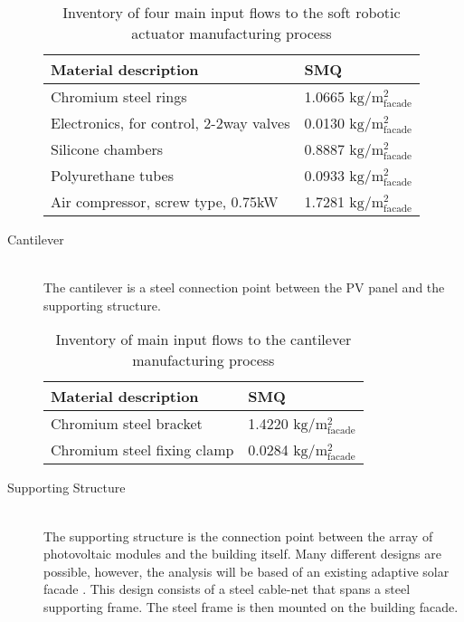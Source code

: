 \begin{description}
\begin{table}[H]
\centering
\begin{tabular}{ll}
\hline
Material description & SMQ \\ \hline
Chromium steel rings	 & 1.0665 ${\mathrm{kg/m^2_{facade}}}$ \\
Electronics, for control, 2-2way valves  & 0.0130  ${\mathrm{kg/m^2_{facade}}}$\\
Silicone chambers & 0.8887 ${\mathrm{kg/m^2_{facade}}}$\\
Polyurethane tubes &0.0933 ${\mathrm{kg/m^2_{facade}}}$\\
Air compressor, screw type, 0.75kW & 1.7281 ${\mathrm{kg/m^2_{facade}}}$\\
\hline
\end{tabular}
\caption{Inventory of four main input flows to the soft robotic actuator manufacturing process }
\label{tab:ActuatorInv}
\end{table}

\item[Cantilever] \hfill \\
The cantilever is a steel connection point between the PV panel and the supporting structure.\\

\begin{table}[H]
\centering
\begin{tabular}{ll}
\hline
Material description & SMQ \\ \hline
Chromium steel bracket	 & 1.4220 ${\mathrm{kg/m^2_{facade}}}$ \\
Chromium steel fixing clamp  & 0.0284 ${\mathrm{kg/m^2_{facade}}}$\\
\hline
\end{tabular}
\caption{Inventory of main input flows to the cantilever manufacturing process }
\label{tab:CantileverInv}
\end{table}

\item[Supporting Structure] \hfill \\
The supporting structure is the connection point between the array of photovoltaic modules and the building itself. Many different designs are possible, however, the analysis will be based of an existing adaptive solar facade \cite{nagy2016adaptive}. This design consists of a steel cable-net that spans a steel supporting frame. The steel frame is then mounted on the building facade.\\


\end{description}
